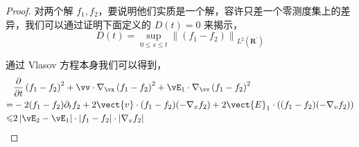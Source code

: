 \begin{proof}

对两个解 $f_{1}, f_{2}$，要说明他们实质是一个解，容许只差一个零测度集上的差异，我们可以通过证明下面定义的 $D(t)=0$ 来揭示，
\[
D(t)=\sup _{0 \leq s \leq t}\left\|\left(f_{1}-f_{2}\right)\right\|_{L^{2}\left(\mathbf{R}^{\prime}\right)}
\]



通过 Vlasov 方程本身我们可以得到，
\[
\begin{aligned}
&\frac{\partial}{\partial t}\left(f_{1}-f_{2}\right)^{2}+\vv \cdot \nabla_{\vx}\left(f_{1}-f_{2}\right)^{2}+\vE_{1} \cdot \nabla_{\vv}\left(f_{1}-f_{2}\right)^{2} \\ 
= & -2(f_1-f_2)\partial_t f_2 +2\vect{v}\cdot (f_1-f_2) (-\nabla_x f_2)+2 \vect{E}_1\cdot \left((f_1-f_2) (-\nabla_v f_2)\right) \\
\leqslant & 2\left|\vE_{2}-\vE_{1}\right| \cdot\left|f_{1}-f_{2}\right| \cdot\left|\nabla_{v} f_{2}\right|
\end{aligned}
\]


\end{proof}
